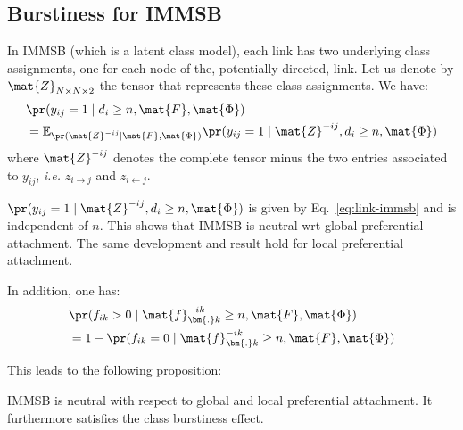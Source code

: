 \subsection{Burstiness for IMMSB}
\label{subsec:burst-immsb}

In IMMSB (which is a latent class model), each link has two underlying class assignments, one for each node of the, potentially directed, link. Let us denote by $\mat{Z}_{N\times N\times 2}$ the tensor that represents these class assignments. We have:
%
\begin{align}
&\pr(y_{ij}=1 \mid d_i \ge n, \mat{F}, \mat{\Phi}) \nonumber \\
&= \mathbb{E}_{\pr(\mat{Z}^{-ij}|\mat{F}, \mat{\Phi})} \pr(y_{ij}=1 \mid \mat{Z}^{-ij}, d_i \ge n, \mat{\Phi}) \nonumber
\end{align}
%
where $\mat{Z}^{-ij}$ denotes the complete tensor minus the two entries associated to $y_{ij}$, \textit{i.e.} $z_{i \rightarrow j}$ and $z_{i \leftarrow j}$.

$\pr(y_{ij}=1 \mid \mat{Z}^{-ij}, d_i \ge n, \mat{\Phi})$ is given by Eq.~\ref{eq:link-immsb} and is independent of $n$. This shows that IMMSB is neutral wrt global preferential attachment. The same development and result hold for local preferential attachment.

In addition, one has:
%
\begin{align}
&\pr(f_{ik} > 0 \mid \mat{f}_{\bm{.}k}^{-ik} \ge n, \mat{F}, \mat{\Phi}) \nonumber \\
&= 1 - \pr(f_{ik} = 0 \mid \mat{f}_{\bm{.}k}^{-ik} \ge n, \mat{F}, \mat{\Phi}) \nonumber
\end{align}
%

This leads to the following proposition:
%
\begin{proposition}
IMMSB is neutral with respect to global and local preferential attachment. It furthermore satisfies the class burstiness effect.
\end{proposition}
%
